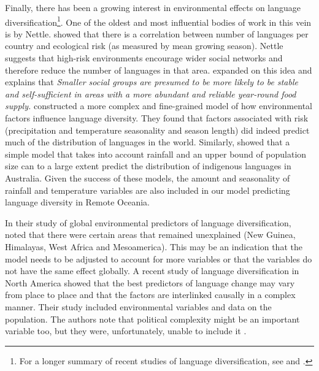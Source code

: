 \documentclass[a4paper,10pt]{article} %
\begin{document}
Finally, there has been a growing interest in environmental effects on language diversification\footnote{For a longer summary of recent studies of language diversification, see \citet{gavin2013toward} and \citet{greenhill2015demographic}.}. One of the oldest and most influential bodies of work in this vein is by Nettle. \citet{NETTLE1998} showed that there is a correlation between number of languages per country and ecological risk (as measured by mean growing season). Nettle suggests that high-risk environments encourage wider social networks and therefore reduce the number of languages in that area. \citet{hua2019ecological} expanded on this idea and explains that \emph{Smaller social groups are presumed to be more likely to be stable and self-sufficient in areas with a more abundant and reliable year-round food supply.} \citet{hua2019ecological} constructed a more complex and fine-grained model of how environmental factors influence language diversity. They found that factors associated with risk (precipitation and temperature seasonality and season length) did indeed predict much of the distribution of languages in the world. Similarly, \citet{gavin2017process} showed that a simple model that takes into account rainfall and an upper bound of population size can to a large extent predict the distribution of indigenous languages in Australia. Given the success of these models, the amount and seasonality of rainfall and temperature variables are also included in our model predicting language diversity in Remote Oceania. 



In their study of global environmental predictors of language diversification, \citet{hua2019ecological} noted that there were certain areas that remained unexplained (New Guinea, Himalayas, West Africa and Mesoamerica). This may be an indication that the model needs to be adjusted to account for more variables or that the variables do not have the same effect globally. A recent study of language diversification in North America \citep{Pacheco_Coelho_2019} showed that the best predictors of language change may vary from place to place and that the factors are interlinked causally in a complex manner. Their study included environmental variables and data on the population. The authors note that political complexity might be an important variable too, but they were, unfortunately, unable to include it \citep[7]{Pacheco_Coelho_2019}.
\end{document}
